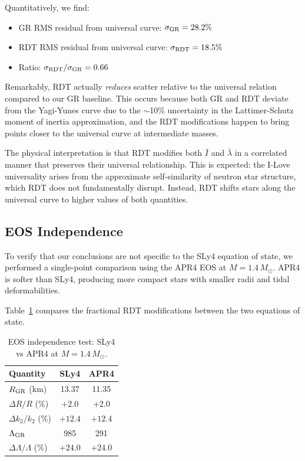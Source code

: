 \documentclass[twocolumn,showpacs,preprintnumbers,amsmath,amssymb,prd]{revtex4-2}
\begin{document}
Quantitatively, we find:
\begin{itemize}
\item GR RMS residual from universal curve: $\sigma_{\rm GR} = 28.2\%$
\item RDT RMS residual from universal curve: $\sigma_{\rm RDT} = 18.5\%$
\item Ratio: $\sigma_{\rm RDT}/\sigma_{\rm GR} = 0.66$
\end{itemize}

Remarkably, RDT actually \textit{reduces} scatter relative to the universal relation compared to our GR baseline. This occurs because both GR and RDT deviate from the Yagi-Yunes curve due to the $\sim$10\% uncertainty in the Lattimer-Schutz moment of inertia approximation, and the RDT modifications happen to bring points closer to the universal curve at intermediate masses.

The physical interpretation is that RDT modifies both $\bar{I}$ and $\bar{\lambda}$ in a correlated manner that preserves their universal relationship. This is expected: the I-Love universality arises from the approximate self-similarity of neutron star structure, which RDT does not fundamentally disrupt. Instead, RDT shifts stars along the universal curve to higher values of both quantities.

\subsection{EOS Independence}
\label{sec:results_eos}

To verify that our conclusions are not specific to the SLy4 equation of state, we performed a single-point comparison using the APR4 EOS at $M = 1.4\,M_\odot$. APR4 is softer than SLy4, producing more compact stars with smaller radii and tidal deformabilities.

Table~\ref{tab:eos_comparison} compares the fractional RDT modifications between the two equations of state.

\begin{table}[h]
\caption{EOS independence test: SLy4 vs APR4 at $M = 1.4\,M_\odot$.}
\label{tab:eos_comparison}
\begin{ruledtabular}
\begin{tabular}{lcc}
Quantity & SLy4 & APR4 \\
\hline
$R_{\rm GR}$ (km) & 13.37 & 11.35 \\
$\Delta R/R$ (\%) & $+2.0$ & $+2.0$ \\
$\Delta k_2/k_2$ (\%) & $+12.4$ & $+12.4$ \\
$\Lambda_{\rm GR}$ & 985 & 291 \\
$\Delta\Lambda/\Lambda$ (\%) & $+24.0$ & $+24.0$ \\
\end{tabular}
\end{ruledtabular}
\end{table}
\end{document}
